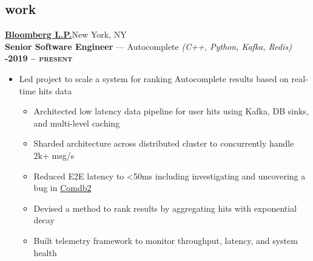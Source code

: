 \documentclass[margin,10.5pt]{res}
\begin{document}
\begin{resume}
\section{\sc \lsstyle work}
    \href{https://www.bloomberg.com/company/careers/working-here/engineering/}{\textbf{\large{} Bloomberg L.P.}}\hfill New York, NY\\
    \textbf{Senior Software Engineer} --- Autocomplete
    \textit{(C++, Python, Kafka, Redis)}\hfill
    \textsc{\bfseries{}-2019 -- present}
    \vspace{0.5em}
    \begin{itemize}
        \setlength\itemsep{0.5em}
        \item Led project to scale a system for ranking Autocomplete results based on real-time hits data
        \begin{itemize}
            \setlength\itemsep{0.3em}
            \item Architected low latency data pipeline for user hits using Kafka, DB sinks, and multi-level caching
            \item Sharded architecture across distributed cluster to concurrently handle 2k+ msg/s
            \item Reduced E2E latency to <50ms including investigating and uncovering a bug in \href{https://en.wikipedia.org/wiki/Comdb2/}{Comdb2}
            \item Devised a method to rank results by aggregating hits with exponential decay
            \item Built telemetry framework to monitor throughput, latency, and system health

\end{itemize}
\end{itemize}
\end{resume}
\end{document}
